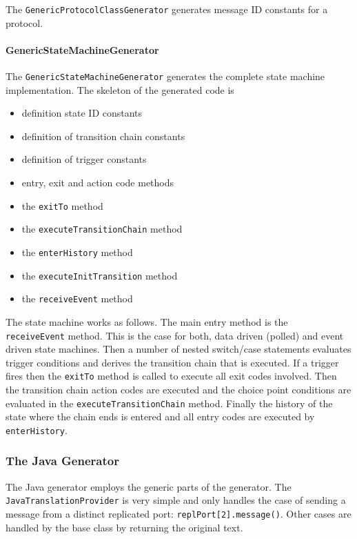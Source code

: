 The \texttt{GenericProtocolClassGenerator} generates message ID constants for a protocol.

\paragraph{GenericStateMachineGenerator}

\begin{flushleft}The \texttt{GenericStateMachineGenerator} generates the complete state machine 
implementation. The skeleton of the generated code is\end{flushleft}

\begin{itemize}
\item definition state ID constants
\item definition of transition chain constants
\item definition of trigger constants
\item entry, exit and action code methods
\item the \texttt{exitTo} method 
\item the \texttt{executeTransitionChain} method
\item the \texttt{enterHistory} method
\item the \texttt{executeInitTransition} method
\item the \texttt{receiveEvent} method
\end{itemize}

The state machine works as follows. The main entry method is the \\ \texttt{receiveEvent} method. This is 
the case for both, data driven (polled) and event driven state machines. Then a number of nested 
switch/case statements evaluates trigger conditions and derives the transition chain that is executed. If 
a trigger fires then the \texttt{exitTo} method is called to execute all exit codes involved. Then the 
transition chain action codes are executed and the choice point conditions are evaluated in the 
\texttt{executeTransitionChain} method. Finally the history of the state where the chain ends is entered 
and all entry codes are executed by \texttt{enterHistory}.

\subsubsection{The Java Generator}

The Java generator employs the generic parts of the generator. The \texttt{JavaTranslationProvider} is 
very simple and only handles the case of sending a message from a distinct replicated port: 
\texttt{replPort[2].message()}. Other cases are handled by the base class by returning the original text.

